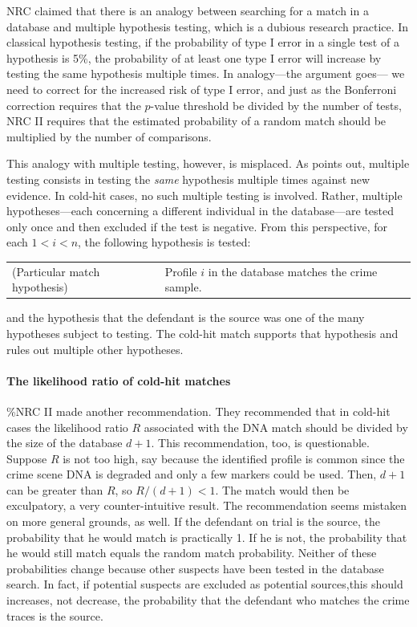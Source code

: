 \documentclass[10pt,dvipsnames,enabledeprecatedfontcommands]{scrartcl}
\let\oldparagraph\paragraph
\renewcommand{\paragraph}[1]{\oldparagraph{#1}\mbox{}}
\begin{document}
NRC claimed that there is an analogy between searching for a match in a
database and multiple hypothesis testing, which is a dubious research
practice. In classical hypothesis testing, if the probability of type I
error in a single test of a hypothesis is 5\%, the probability of at
least one type I error will increase by testing the same hypothesis
multiple times. In analogy---the argument goes--- we need to correct for
the increased risk of type I error, and just as the Bonferroni
correction requires that the \(p\)-value threshold be divided by the
number of tests, NRC II requires that the estimated probability of a
random match should be multiplied by the number of comparisons.

This analogy with multiple testing, however, is misplaced. As
\citet{balding2002DNDatabaseSearch} points out, multiple testing
consists in testing the \textit{same} hypothesis multiple times against
new evidence. In cold-hit cases, no such multiple testing is involved.
Rather, multiple hypotheses---each concerning a different individual in
the database---are tested only once and then excluded if the test is
negative. From this perspective, for each \(1 < i <n\), the following
hypothesis is tested: \vspace{1mm}

\begin{tabular}{lp{8cm}}
(Particular match hypothesis) &
Profile $i$ in the database matches the crime sample.
\end{tabular}

\vspace{1mm} \noindent and the hypothesis that the defendant is the
source was one of the many hypotheses subject to testing. The cold-hit
match supports that hypothesis and rules out multiple other hypotheses.

\paragraph{The likelihood ratio of cold-hit matches}

\%NRC II made another recommendation. They recommended that in cold-hit
cases the likelihood ratio \(R\) associated with the DNA match should be
divided by the size of the database \(d+1\). This recommendation, too,
is questionable. Suppose \(R\) is not too high, say because the
identified profile is common since the crime scene DNA is degraded and
only a few markers could be used. Then, \(d+1\) can be greater than
\(R\), so \(R/(d+1)<1\). The match would then be exculpatory, a very
counter-intuitive result. The recommendation seems mistaken on more
general grounds, as well. If the defendant on trial is the source, the
probability that he would match is practically 1. If he is not, the
probability that he would still match equals the random match
probability. Neither of these probabilities change because other
suspects have been tested in the database search. In fact, if potential
suspects are excluded as potential sources,this should increases, not
decrease, the probability that the defendant who matches the crime
traces is the source.
\end{document}
